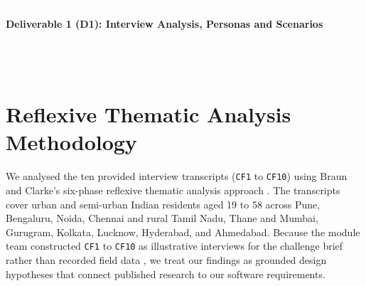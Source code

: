 \documentclass[12pt, a4paper]{article}
\begin{document}
\begin{tcolorbox}[enhanced, colback=cNavy, colframe=cNavy, arc=3pt, left=8pt, right=8pt, top=7pt, bottom=7pt]
\begin{center}
    {\Large\bfseries\textcolor{white}{COMP2300: Software Design and Development Project}}\\[0.2em]
    {\large\bfseries\textcolor{bgSand}{Deliverable 1 (D1): Interview Analysis, Personas and Scenarios}}\\[0.15em]
    {\small\itshape\textcolor{white}{Topic 1: Carbon Footprint Awareness and Reduction Tool (Urban India Context)}}\\[0.35em]
    {\footnotesize\textcolor{white}{\textbf{Version:} 1.6 \quad|\quad \textbf{Date:} October 2026 \quad|\quad \textbf{Authors:} Arnav (\texttt{arnav@soton.ac.uk}), Hiranya (\texttt{hiranya@soton.ac.uk}), Keshav (\texttt{keshav@soton.ac.uk})}}
\end{center}
\end{tcolorbox}

\section{Reflexive Thematic Analysis Methodology}
We analysed the ten provided interview transcripts (\texttt{CF1} to \texttt{CF10}) \cite{cf1, cf2, cf3, cf4, cf5, cf6, cf7, cf8, cf9, cf10} using Braun and Clarke's six-phase reflexive thematic analysis approach \cite{braun2006, braun2019}. The transcripts cover urban and semi-urban Indian residents aged 19 to 58 across Pune, Bengaluru, Noida, Chennai and rural Tamil Nadu, Thane and Mumbai, Gurugram, Kolkata, Lucknow, Hyderabad, and Ahmedabad. Because the module team constructed \texttt{CF1} to \texttt{CF10} as illustrative interviews for the challenge brief rather than recorded field data \cite{cf1, cf10}, we treat our findings as grounded design hypotheses that connect published research \cite{lee2021, khandelwal2019} to our software requirements.
\end{document}
